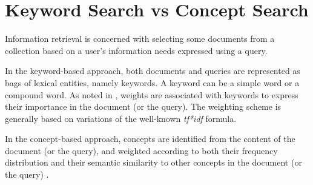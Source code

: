 \section{Keyword Search vs Concept Search}
Information retrieval is concerned with selecting some documents from a collection based on a user's information needs expressed using a query.

In the keyword-based approach, both documents and queries are represented as bags of lexical entities, namely keywords. A keyword can be a simple word or a compound word. As noted in \cite{Salton1988}, weights are associated with keywords to express their importance in the document (or the query). The weighting scheme is generally based on variations of the well-known \textit{tf*idf} formula.

In the concept-based approach, concepts are identified from the content of the document (or the query), and weighted according to both their frequency distribution and their semantic similarity to other concepts in the document (or the query) \cite{Boubekeur2013}.  


